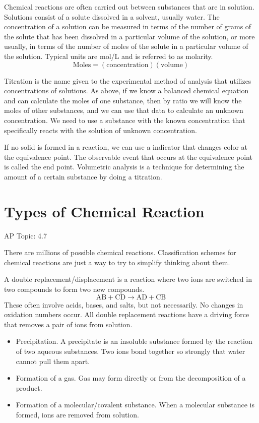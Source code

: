 \documentclass[../chem.tex]{subfiles}
\begin{document}
Chemical reactions are often carried out between substances that are in solution. Solutions consist of a solute dissolved in a solvent, usually water.
The concentration of a solution can be measured in terms of the number of grams of the solute that has been dissolved in a particular volume of the 
solution, or more usually, in terms of the number of moles of the solute in a particular volume of the solution. Typical units are mol/L and is referred to as molarity.
\[\text{Moles}=(\text{concentration})(\text{volume})\]

Titration is the name given to the experimental method of analysis that utilizes concentrations of solutions. As above, if we know a balanced 
chemical equation and can calculate the moles of one substance, then by ratio we will know the moles of other substances, and we can use that data 
to calculate an unknown concentration. We need to use a substance with the known concentration that specifically reacts with the solution of unknown
concentration.

If no solid is formed in a reaction, we can use a indicator that changes color at the equivalence point. The observable event that occurs 
at the equivalence point is called the end point. Volumetric analysis is a technique for determining the amount of a certain substance by doing a titration.
\section{Types of Chemical Reaction}
AP Topic: 4.7

There are millions of possible chemical reactions. Classification schemes for chemical reactions are just a way to try to simplify 
thinking about them.

A double replacement/displacement is a reaction where two ions are switched in two compounds to form two new compounds.
\[\text{AB}+\text{CD}\rightarrow \text{AD}+\text{CB}\]
These often involve acids, bases, and salts, but not necessarily. No changes in oxidation numbers occur. All double replacement reactions 
have a driving force that removes a pair of ions from solution.
\begin{itemize}
    \item Precipitation. A precipitate is an insoluble substance formed by the reaction of two aqueous substances. Two ions bond together so strongly that water cannot pull them apart.
    \item Formation of a gas. Gas may form directly or from the decomposition of a product.
    \item Formation of a molecular/covalent substance. When a molecular substance is formed, ions are removed from solution.
\end{itemize}
\end{document}
